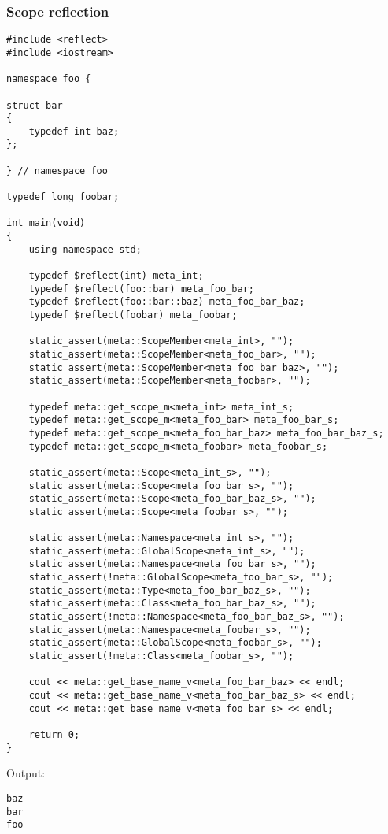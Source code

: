 \subsubsection{Scope reflection}

\begin{verbatim}
#include <reflect>
#include <iostream>

namespace foo {

struct bar
{
	typedef int baz;
};

} // namespace foo

typedef long foobar;

int main(void)
{
	using namespace std;

	typedef $reflect(int) meta_int;
	typedef $reflect(foo::bar) meta_foo_bar;
	typedef $reflect(foo::bar::baz) meta_foo_bar_baz;
	typedef $reflect(foobar) meta_foobar;

	static_assert(meta::ScopeMember<meta_int>, "");
	static_assert(meta::ScopeMember<meta_foo_bar>, "");
	static_assert(meta::ScopeMember<meta_foo_bar_baz>, "");
	static_assert(meta::ScopeMember<meta_foobar>, "");

	typedef meta::get_scope_m<meta_int> meta_int_s;
	typedef meta::get_scope_m<meta_foo_bar> meta_foo_bar_s;
	typedef meta::get_scope_m<meta_foo_bar_baz> meta_foo_bar_baz_s;
	typedef meta::get_scope_m<meta_foobar> meta_foobar_s;

	static_assert(meta::Scope<meta_int_s>, "");
	static_assert(meta::Scope<meta_foo_bar_s>, "");
	static_assert(meta::Scope<meta_foo_bar_baz_s>, "");
	static_assert(meta::Scope<meta_foobar_s>, "");

	static_assert(meta::Namespace<meta_int_s>, "");
	static_assert(meta::GlobalScope<meta_int_s>, "");
	static_assert(meta::Namespace<meta_foo_bar_s>, "");
	static_assert(!meta::GlobalScope<meta_foo_bar_s>, "");
	static_assert(meta::Type<meta_foo_bar_baz_s>, "");
	static_assert(meta::Class<meta_foo_bar_baz_s>, "");
	static_assert(!meta::Namespace<meta_foo_bar_baz_s>, "");
	static_assert(meta::Namespace<meta_foobar_s>, "");
	static_assert(meta::GlobalScope<meta_foobar_s>, "");
	static_assert(!meta::Class<meta_foobar_s>, "");

	cout << meta::get_base_name_v<meta_foo_bar_baz> << endl;
	cout << meta::get_base_name_v<meta_foo_bar_baz_s> << endl;
	cout << meta::get_base_name_v<meta_foo_bar_s> << endl;

	return 0;
}
\end{verbatim}

Output:

\begin{verbatim}
baz
bar
foo
\end{verbatim}

